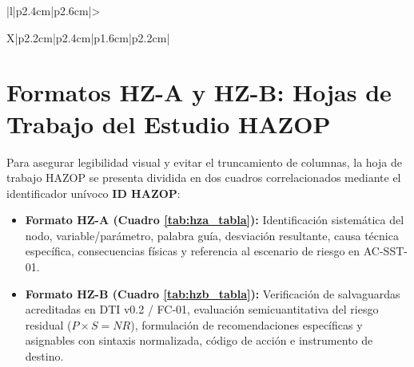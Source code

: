 \documentclass[10pt,letterpaper]{article}
\begin{document}
\begin{landscape}
\begin{xltabular}{\linewidth}{|l|p{2.4cm}|p{2.6cm}|>{\raggedright\arraybackslash}X|p{2.2cm}|p{2.4cm}|p{1.6cm}|p{2.2cm}|}
\end{xltabular}
\end{landscape}
\newpage

\section{Formatos HZ-A y HZ-B: Hojas de Trabajo del Estudio HAZOP}
Para asegurar legibilidad visual y evitar el truncamiento de columnas, la hoja de trabajo HAZOP se presenta dividida en dos cuadros correlacionados mediante el identificador unívoco \textbf{ID HAZOP}:
\begin{itemize}
    \item \textbf{Formato HZ-A (Cuadro \ref{tab:hza_tabla}):} Identificación sistemática del nodo, variable/parámetro, palabra guía, desviación resultante, causa técnica específica, consecuencias físicas y referencia al escenario de riesgo en AC-SST-01.
    \item \textbf{Formato HZ-B (Cuadro \ref{tab:hzb_tabla}):} Verificación de salvaguardas acreditadas en DTI v0.2 / FC-01, evaluación semicuantitativa del riesgo residual ($P \times S = NR$), formulación de recomendaciones específicas y asignables con sintaxis normalizada, código de acción e instrumento de destino.
\end{itemize}
\end{document}
